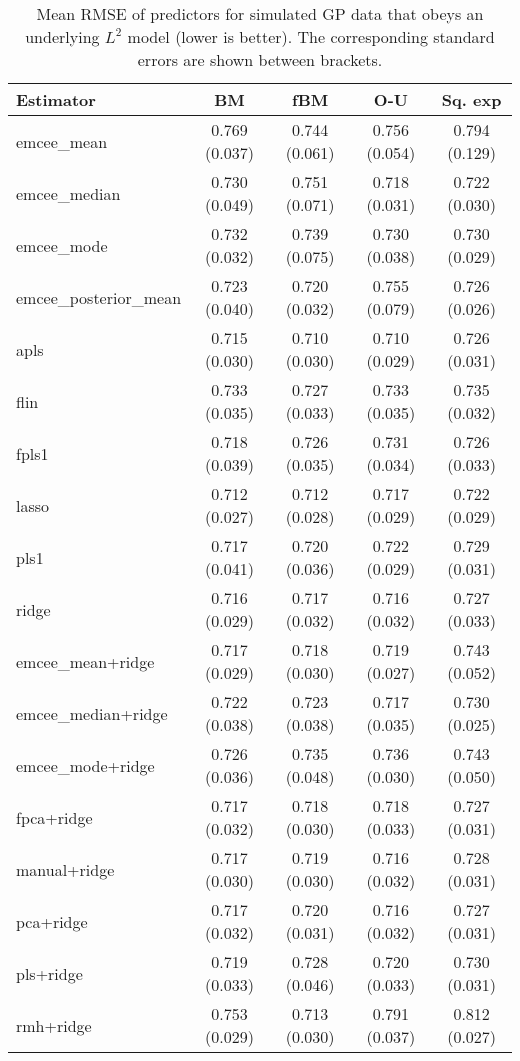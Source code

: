 \newpage

\setlength{\voffset}{0cm}
\setlength{\footskip}{50.75pt}

\begin{table}[htbp!]
  \centering
  \begin{tabular}{lcccc}
\toprule
            \textbf{Estimator} &            \textbf{BM} &           \textbf{fBM} &           \textbf{O-U} &        \textbf{Sq. exp} \\
\midrule
          emcee\_mean & 0.769 (0.037) & 0.744 (0.061) & 0.756 (0.054) & 0.794 (0.129) \\
        emcee\_median & 0.730 (0.049) & 0.751 (0.071) & 0.718 (0.031) & 0.722 (0.030) \\
          emcee\_mode & 0.732 (0.032) & 0.739 (0.075) & 0.730 (0.038) & 0.730 (0.029) \\
emcee\_posterior\_mean & 0.723 (0.040) & 0.720 (0.032) & 0.755 (0.079) & 0.726 (0.026) \\
                apls & 0.715 (0.030) & 0.710 (0.030) & 0.710 (0.029) & 0.726 (0.031) \\
                flin & 0.733 (0.035) & 0.727 (0.033) & 0.733 (0.035) & 0.735 (0.032) \\
               fpls1 & 0.718 (0.039) & 0.726 (0.035) & 0.731 (0.034) & 0.726 (0.033) \\
               lasso & 0.712 (0.027) & 0.712 (0.028) & 0.717 (0.029) & 0.722 (0.029) \\
                pls1 & 0.717 (0.041) & 0.720 (0.036) & 0.722 (0.029) & 0.729 (0.031) \\
               ridge & 0.716 (0.029) & 0.717 (0.032) & 0.716 (0.032) & 0.727 (0.033) \\
\bottomrule
\toprule
 emcee\_mean+ridge & 0.717 (0.029) & 0.718 (0.030) & 0.719 (0.027) & 0.743 (0.052) \\
emcee\_median+ridge & 0.722 (0.038) & 0.723 (0.038) & 0.717 (0.035) & 0.730 (0.025) \\
  emcee\_mode+ridge & 0.726 (0.036) & 0.735 (0.048) & 0.736 (0.030) & 0.743 (0.050) \\
        fpca+ridge & 0.717 (0.032) & 0.718 (0.030) & 0.718 (0.033) & 0.727 (0.031) \\
      manual+ridge & 0.717 (0.030) & 0.719 (0.030) & 0.716 (0.032) & 0.728 (0.031) \\
         pca+ridge & 0.717 (0.032) & 0.720 (0.031) & 0.716 (0.032) & 0.727 (0.031) \\
         pls+ridge & 0.719 (0.033) & 0.728 (0.046) & 0.720 (0.033) & 0.730 (0.031) \\
         rmh+ridge & 0.753 (0.029) & 0.713 (0.030) & 0.791 (0.037) & 0.812 (0.027) \\
\bottomrule
\end{tabular}
  \caption{Mean RMSE of predictors for simulated GP data that obeys an underlying \(L^2\) model (lower is better). The corresponding standard errors are shown between brackets.}
\end{table}

